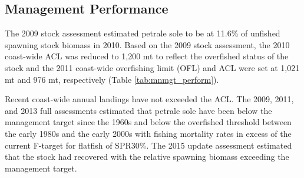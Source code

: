 \documentclass[12pt,]{article}
\begin{document}
\FloatBarrier

\subsection*{Management Performance}\label{management-performance}

The 2009 stock assessment estimated petrale sole to be at 11.6\% of
unfished spawning stock biomass in 2010. Based on the 2009 stock
assessment, the 2010 coast-wide ACL was reduced to 1,200 mt to reflect
the overfished status of the stock and the 2011 coast-wide overfishing
limit (OFL) and ACL were set at 1,021 mt and 976 mt, respectively (Table
\ref{tab:mnmgt_perform}).

Recent coast-wide annual landings have not exceeded the ACL. The 2009,
2011, and 2013 full assessments estimated that petrale sole have been
below the management target since the 1960s and below the overfished
threshold between the early 1980s and the early 2000s with fishing
mortality rates in excess of the current F-target for flatfish of
SPR30\%. The 2015 update assessment estimated that the stock had
recovered with the relative spawning biomass exceeding the management
target.

\begin{table}[ht]
\centering
\caption{Recent trend in total catch and  
                              landings (mt) relative to the management guidelines. 
                              Estimated total catch reflect the landings 
                              plus the model estimated discarded biomass based on discard rate data.} 
\label{tab:mnmgt_perform}
\end{table}
\end{document}
